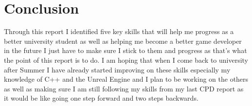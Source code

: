 \documentclass{scrartcl}
\begin{document}
\section*{Conclusion}
Through this report I identified five key skills that will help me progress as a better university student as well as helping me become a better game developer in the future I just have to make sure I stick to them and progress as that's what the point of this report is to do. I am hoping that when I come back to university after Summer I have already started improving on these skills especially my knowledge of C++ and the Unreal Engine and I plan to be working on the others as well as making sure I am still following my skills from my last CPD report as it would be like going one step forward and two steps backwards.




\end{document}
